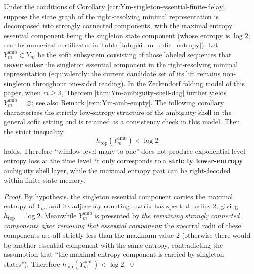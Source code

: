 \begin{corollary}\label{cor:Ym-ambiguity-shell-low-entropy}
Under the conditions of Corollary \ref{cor:Ym-singleton-essential-finite-delay}, suppose the state graph of the right-resolving minimal representation is decomposed into strongly connected components, with the maximal entropy essential component being the singleton state component (whose entropy is \(\log 2\); see the numerical certificates in Table \ref{tab:phi_m_sofic_entropy}).
Let \(Y_m^{\mathrm{amb}}\subset Y_m\) be the sofic subsystem consisting of those labeled sequences that \textbf{never enter} the singleton essential component in the right-resolving minimal representation (equivalently: the current candidate set of its lift remains non-singleton throughout one-sided reading).
In the Zeckendorf folding model of this paper, when \(m\ge 3\), Theorem \ref{thm:Ym-ambiguity-shell-dag} further yields \(Y_m^{\mathrm{amb}}=\varnothing\); see also Remark \ref{rem:Ym-amb-empty}. The following corollary characterizes the strictly low-entropy structure of the ambiguity shell in the general sofic setting and is retained as a consistency check in this model.
Then the strict inequality
\[
h_{\mathrm{top}}(Y_m^{\mathrm{amb}})<\log 2
\]
holds. Therefore ``window-level many-to-one'' does not produce exponential-level entropy loss at the time level; it only corresponds to a \textbf{strictly lower-entropy} ambiguity shell layer, while the maximal entropy part can be right-decoded within finite-state memory.
\end{corollary}
\begin{proof}
By hypothesis, the singleton essential component carries the maximal entropy of \(Y_m\), and its adjacency counting matrix has spectral radius \(2\), giving \(h_{\mathrm{top}}=\log 2\).
Meanwhile \(Y_m^{\mathrm{amb}}\) is presented by \emph{the remaining strongly connected components after removing that essential component}: the spectral radii of these components are all strictly less than the maximum value \(2\) (otherwise there would be another essential component with the same entropy, contradicting the assumption that ``the maximal entropy component is carried by singleton states'').
Therefore \(h_{\mathrm{top}}(Y_m^{\mathrm{amb}})<\log 2\). \qed
\end{proof}

